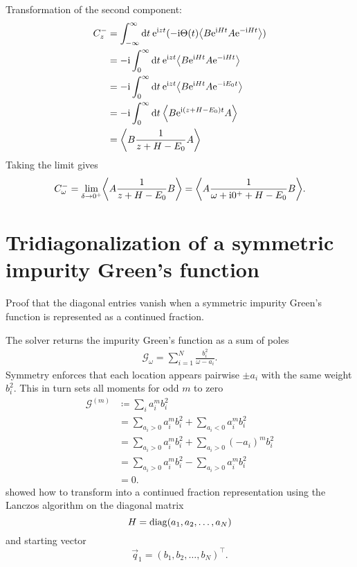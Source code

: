 Transformation of the second component:
\begin{align}
    C^-_z
     & =
    \int_{-\infty}^\infty \md t \>
    \me^{\mi zt}(-\mi \Theta(t) \expval*{B \me^{\mi Ht} A \me^{-\mi Ht}}) \\
     & =
    -\mi \int_0^\infty \md t \>
    \me^{\mi zt} \expval*{B \me^{\mi Ht} A \me^{-\mi Ht}}                 \\
     & =
    -\mi \int_0^\infty \md t \>
    \me^{\mi zt} \expval*{B \me^{\mi Ht} A \me^{-\mi E_0t}}               \\
     & =
    -\mi \int_0^\infty \md t \>
    \expval*{B \me^{\mi(z + H - E_0)t} A}                                 \\
     & =
    \expval*{B \frac{1}{z + H - E_0} A}
\end{align}
Taking the limit gives
\begin{equation}
    C^-_\omega
    =
    \lim_{\delta\to 0^+} \expval*{A \frac{1}{z + H - E_0} B}
    =
    \expval*{A \frac{1}{\omega + \mi0^+ + H - E_0} B}.
\end{equation}

\section{Tridiagonalization of a symmetric impurity Green's function}

Proof that the diagonal entries vanish when a symmetric impurity Green's function
is represented as a continued fraction.

The solver returns the impurity Green's function as a sum of poles
\begin{align}
    \mathcal{G}_{\!\omega} = \sum_{i=1}^N \frac{b_i^2}{\omega - a_i}.
    \label{eq:impurity-greens-function}
\end{align}
Symmetry enforces that each location appears pairwise $\pm a_i$
with the same weight $b_i^2$.
This in turn sets all moments for odd $m$ to zero
\begin{align}
    \mathcal{G}^{(m)}
     & \coloneqq
    \sum_i a_i^m b_i^2                                     \\
     & =
    \sum_{a_i>0} a_i^m b_i^2 + \sum_{a_i<0} a_i^m b_i^2    \\
     & =
    \sum_{a_i>0} a_i^m b_i^2 + \sum_{a_i>0} (-a_i)^m b_i^2 \\
     & =
    \sum_{a_i>0} a_i^m b_i^2 - \sum_{a_i>0} a_i^m b_i^2    \\
     & =
    0.
\end{align}
\citeauthor{Lu2014} \cite{Lu2014} showed how to transform
 into a continued fraction representation
using the Lanczos algorithm on the diagonal matrix
\begin{equation}
    H
    =
    \operatorname{diag}(a_1, a_2, \ldots, a_N)
\end{equation}
and starting vector
\begin{equation}
    \vec{q}_1 = (b_1, b_2, \ldots, b_N)^\top.
\end{equation}

